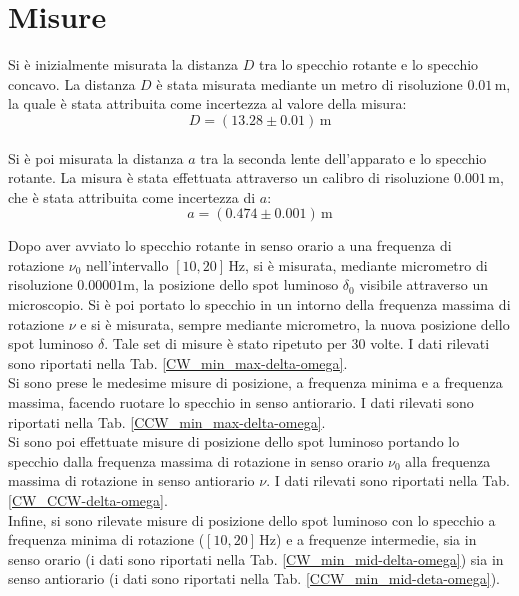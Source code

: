\documentclass[]{article}
\let\oldsection\section%
\renewcommand{\section}{%
	\renewcommand{\theequation}{\thesection.\arabic{equation}}%
	\oldsection}%
\begin{document}
    \section{Misure}
    
    Si è inizialmente misurata la distanza $D$ tra lo specchio rotante e lo specchio concavo. La distanza $D$ è stata misurata mediante un metro di risoluzione $ 0.01 \, \text{m} $, la quale è stata attribuita come incertezza al valore della misura:
    \begin{equation}
        \label{equation-for-D}
        D = (13.28 \pm 0.01) \, \text{m}
    \end{equation} \\
    Si è poi misurata la distanza $a$ tra la seconda lente dell'apparato e lo specchio rotante. La misura è stata effettuata attraverso un calibro di risoluzione $ 0.001 \, \text{m} $, che è stata attribuita come incertezza di $a$:
    \begin{equation}
        \label{equation for a}
        a = (0.474 \pm 0.001) \, \text{m}
    \end{equation}

    Dopo aver avviato lo specchio rotante in senso orario a una frequenza di rotazione $ \nu_0 $ nell'intervallo $[10,20] \, \text{Hz}$, si è misurata, mediante micrometro di risoluzione $ 0.00001 \text{m} $, la posizione dello spot luminoso $\delta_0$ visibile attraverso un microscopio. Si è poi portato lo specchio in un intorno della frequenza massima di rotazione $ \nu $ e si è misurata, sempre mediante micrometro, la nuova posizione dello spot luminoso $\delta$. Tale set di misure è stato ripetuto per $30$ volte. I dati rilevati sono riportati nella Tab. \ref{CW_min_max-delta-omega}. \\
    Si sono prese le medesime misure di posizione, a frequenza minima e a frequenza massima, facendo ruotare lo specchio in senso antiorario. I dati rilevati sono riportati nella Tab. \ref{CCW_min_max-delta-omega}. \\
    Si sono poi effettuate misure di posizione dello spot luminoso portando lo specchio dalla frequenza massima di rotazione in senso orario $\nu_0$ alla frequenza massima di rotazione in senso antiorario $\nu$. I dati rilevati sono riportati nella Tab. \ref{CW_CCW-delta-omega}. \\
    Infine, si sono rilevate misure di posizione dello spot luminoso con lo specchio a frequenza minima di rotazione ($[10,20] \, \text{Hz}$) e a frequenze intermedie, sia in senso orario (i dati sono riportati nella Tab. \ref{CW_min_mid-delta-omega}) sia in senso antiorario (i dati sono riportati nella Tab. \ref{CCW_min_mid-deta-omega}).
\end{document}
